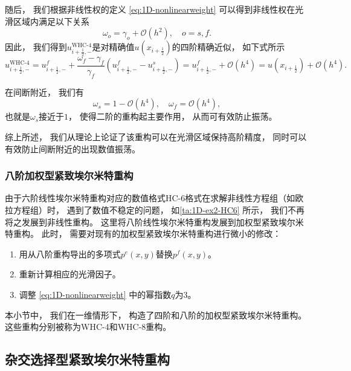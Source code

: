 随后，
我们根据非线性权的定义 \cref{eq:1D-nonlinearweight} 可以得到非线性权在光滑区域内满足以下关系
\begin{equation}
  \omega_{{o}}= \gamma_{{o}}+ {\mathcal{O}}(h^2) , \quad {{o}}={{s}}, {{f}}.
\end{equation}
因此，
我们得到$u_{i+\frac{1}{2},-}^{\text{WHC-4}}$是对精确值$u(x_{i+\frac{1}{2}})$的四阶精确近似，
如下式所示
\begin{equation}
  u_{i+\frac{1}{2},-}^{\text{WHC-4}}= u_{i+\frac{1}{2},-}^{{f}}+ \frac{\omega_{{f}}- \gamma_{{f}}}{\gamma_{{f}}}\left(u_{i+\frac{1}{2},-}^{{f}}-u_{i+\frac{1}{2},-}^{{s}}\right) = u_{i+\frac{1}{2},-}^{{f}}+ {\mathcal{O}}(h^4)= u(x_{i+\frac{1}{2}})+{\mathcal{O}}(h^4).
\end{equation}

在间断附近，
我们有
\begin{equation}
  \omega_{{s}}= 1-{\mathcal{O}}(h^4), \quad \omega_{{f}}= {\mathcal{O}}(h^4),
\end{equation}
也就是$\omega_{{s}}$接近于$1$，
使得二阶的重构起主要作用，
从而可有效防止振荡。

综上所述，
我们从理论上论证了该重构可以在光滑区域保持高阶精度，
同时可以有效防止间断附近的出现数值振荡。

\subsubsection{八阶加权型紧致埃尔米特重构}

由于六阶线性埃尔米特重构对应的数值格式HC-6格式在求解非线性方程组（如欧拉方程组）时，
遇到了数值不稳定的问题，
如\cref{ta:1D-ex2-HC6} 所示，
我们不再将之发展到非线性重构。
这里将八阶线性埃尔米特重构发展到加权型紧致埃尔米特重构。
此时，
需要对现有的加权型紧致埃尔米特重构进行微小的修改：
\begin{enumerate}
  \item 用从八阶重构导出的多项式$p^{{e}}(x,y)$替换$p^{{f}}(x,y)$。
  \item 重新计算相应的光滑因子。
  \item 调整 \cref{eq:1D-nonlinearweight} 中的幂指数$q$为3。
\end{enumerate}

\vspace{0.5\baselineskip} %
本小节中，
我们在一维情形下，
构造了四阶和八阶的加权型紧致埃尔米特重构。
这些重构分别被称为WHC-4和WHC-8重构。

\subsection{杂交选择型紧致埃尔米特重构}

